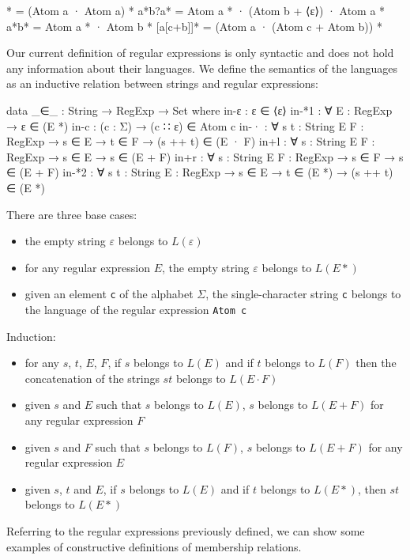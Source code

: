 \begin{agda}
[aa]* = (Atom a · Atom a) *
a*b?a* = Atom a * · (Atom b + ⟨ε⟩) · Atom a *
a*b* = Atom a * · Atom b *
[a[c+b]]* = (Atom a · (Atom c + Atom b)) *
\end{agda}
Our current definition of regular expressions is only syntactic and does not hold any information about their languages. We define the semantics of the languages as an inductive relation between strings and regular expressions:
\begin{agda}
data _∈_ : String → RegExp → Set where
  in-ε  : ε ∈ ⟨ε⟩
  in-*1 : ∀ {E : RegExp}
          → ε ∈ (E *)
  in-c  : (c : Σ) → (c ∷ ε) ∈ Atom c
  in-·  : ∀ {s t : String} {E F : RegExp}
          → s ∈ E
          → t ∈ F
          → (s ++ t) ∈ (E · F)
  in+l  : ∀ {s : String} {E F : RegExp}
          → s ∈ E
          → s ∈ (E + F)
  in+r  : ∀ {s : String} {E F : RegExp}
          → s ∈ F
          → s ∈ (E + F)
  in-*2 : ∀ {s t : String} {E : RegExp}
          → s ∈ E
          → t ∈ (E *)
          → (s ++ t) ∈ (E *)
\end{agda}
There are three base cases:
\begin{itemize}
    \item the empty string $ε$ belongs to $L(ε)$
    \item for any regular expression $E$, the empty string $ε$ belongs to $L(E*)$
    \item given an element \texttt{c} of the alphabet $\Sigma$, the single-character string \texttt{c} belongs to the language of the regular expression \texttt{Atom c}
\end{itemize}
Induction: 
\begin{itemize}
    \item for any $s$, $t$, $E$, $F$, if $s$ belongs to $L(E)$ and  if $t$ belongs to $L(F)$ then the concatenation of the strings $st$ belongs to $L(E \cdot F)$
    \item given $s$ and $E$ such that $s$ belongs to $L(E)$, $s$ belongs to $L(E + F)$ for any regular expression $F$
     \item given $s$ and $F$ such that $s$ belongs to $L(F)$, $s$ belongs to $L(E + F)$ for any regular expression $E$
    \item given $s$, $t$ and $E$, if $s$ belongs to $L(E)$ and if $t$ belongs to $L(E*)$, then $st$ belongs to $L(E*)$
\end{itemize}
Referring to the regular expressions previously defined, we can show some examples of constructive definitions of membership relations. \\
